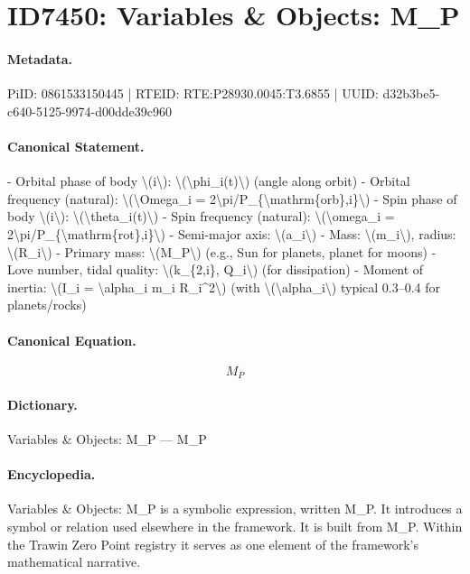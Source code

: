 \section*{ID7450: Variables \& Objects: M\_P}
\paragraph{Metadata.}
PiID: 0861533150445 | RTEID: RTE:P28930.0045:T3.6855 | UUID: d32b3be5-c640-5125-9974-d00dde39c960

\paragraph{Canonical Statement.}
- Orbital phase of body \textbackslash{}(i\textbackslash{}): \textbackslash{}(\textbackslash{}phi\_i(t)\textbackslash{}) (angle along orbit) - Orbital frequency (natural): \textbackslash{}(\textbackslash{}Omega\_i = 2\textbackslash{}pi/P\_\{\textbackslash{}mathrm\{orb\},i\}\textbackslash{}) - Spin phase of body \textbackslash{}(i\textbackslash{}): \textbackslash{}(\textbackslash{}theta\_i(t)\textbackslash{}) - Spin frequency (natural): \textbackslash{}(\textbackslash{}omega\_i = 2\textbackslash{}pi/P\_\{\textbackslash{}mathrm\{rot\},i\}\textbackslash{}) - Semi-major axis: \textbackslash{}(a\_i\textbackslash{}) - Mass: \textbackslash{}(m\_i\textbackslash{}), radius: \textbackslash{}(R\_i\textbackslash{}) - Primary mass: \textbackslash{}(M\_P\textbackslash{}) (e.g., Sun for planets, planet for moons) - Love number, tidal quality: \textbackslash{}(k\_\{2,i\}, Q\_i\textbackslash{}) (for dissipation) - Moment of inertia: \textbackslash{}(I\_i = \textbackslash{}alpha\_i m\_i R\_i\textasciicircum{}2\textbackslash{}) (with \textbackslash{}(\textbackslash{}alpha\_i\textbackslash{}) typical 0.3–0.4 for planets/rocks)

\paragraph{Canonical Equation.}
\[
M_P
\]

\paragraph{Dictionary.}
Variables \& Objects: M\_P — M\_P

\paragraph{Encyclopedia.}
Variables \& Objects: M\_P is a symbolic expression, written M\_P. It introduces a symbol or relation used elsewhere in the framework. It is built from M\_P. Within the Trawin Zero Point registry it serves as one element of the framework's mathematical narrative.
